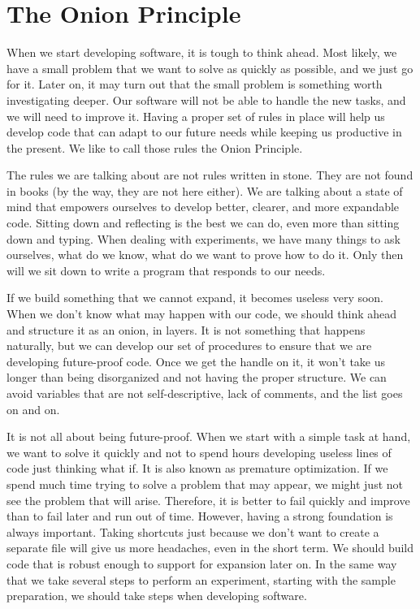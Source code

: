 \section{The Onion Principle}\label{sec:onion-principle}
When we start developing software, it is tough to think ahead. Most likely, we have a small problem that we want to solve as quickly as possible, and we just go for it. Later on, it may turn out that the small problem is something worth investigating deeper. Our software will not be able to handle the new tasks, and we will need to improve it. Having a proper set of rules in place will help us develop code that can adapt to our future needs while keeping us productive in the present. We like to call those rules the Onion Principle.

The rules we are talking about are not rules written in stone. They are not found in books (by the way, they are not here either). We are talking about a state of mind that empowers ourselves to develop better, clearer, and more expandable code. Sitting down and reflecting is the best we can do, even more than sitting down and typing. When dealing with experiments, we have many things to ask ourselves, what do we know, what do we want to prove how to do it. Only then will we sit down to write a program that responds to our needs.

If we build something that we cannot expand, it becomes useless very soon. When we don't know what may happen with our code, we should think ahead and structure it as an onion, in layers. It is not something that happens naturally, but we can develop our set of procedures to ensure that we are developing future-proof code. Once we get the handle on it, it won't take us longer than being disorganized and not having the proper structure. We can avoid variables that are not self-descriptive, lack of comments, and the list goes on and on.

It is not all about being future-proof. When we start with a simple task at hand, we want to solve it quickly and not to spend hours developing useless lines of code just thinking what if. It is also known as premature optimization. If we spend much time trying to solve a problem that may appear, we might just not see the problem that will arise. Therefore, it is better to fail quickly and improve than to fail later and run out of time. However, having a strong foundation is always important. Taking shortcuts just because we don't want to create a separate file will give us more headaches, even in the short term. We should build code that is robust enough to support for expansion later on. In the same way that we take several steps to perform an experiment, starting with the sample preparation, we should take steps when developing software.

